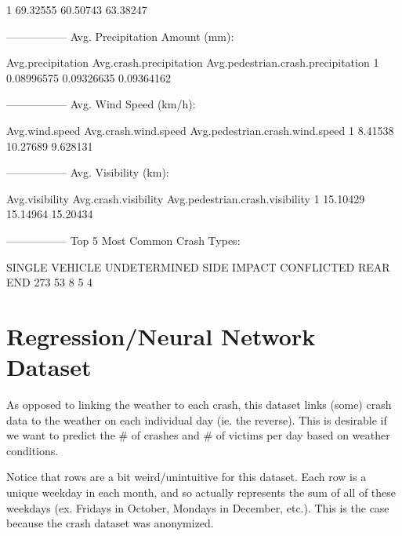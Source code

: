 \documentclass[11pt, a4paper]{article}
\begin{document}
\begin{Schunk}
\begin{Soutput}
1     69.32555           60.50743                      63.38247
\end{Soutput}
\begin{Soutput}
-----------------
Avg. Precipitation Amount (mm):
\end{Soutput}
\begin{Soutput}
  Avg.precipitation Avg.crash.precipitation Avg.pedestrian.crash.precipitation
1        0.08996575              0.09326635                         0.09364162
\end{Soutput}
\begin{Soutput}
-----------------
Avg. Wind Speed (km/h):
\end{Soutput}
\begin{Soutput}
  Avg.wind.speed Avg.crash.wind.speed Avg.pedestrian.crash.wind.speed
1        8.41538             10.27689                        9.628131
\end{Soutput}
\begin{Soutput}
-----------------
Avg. Visibility (km):
\end{Soutput}
\begin{Soutput}
  Avg.visibility Avg.crash.visibility Avg.pedestrian.crash.visibility
1       15.10429             15.14964                        15.20434
\end{Soutput}
\begin{Soutput}
-----------------
Top 5 Most Common Crash Types:
\end{Soutput}
\begin{Soutput}
SINGLE VEHICLE   UNDETERMINED    SIDE IMPACT     CONFLICTED       REAR END 
           273             53              8              5              4 
\end{Soutput}
\end{Schunk}









\pagebreak
\section{Regression/Neural Network Dataset}

As opposed to linking the weather to each crash, this dataset links (some) crash data to the weather on each individual day (ie. the reverse). This is desirable if we want to predict the \# of crashes and \# of victims per day based on weather conditions. 


Notice that rows are a bit weird/unintuitive for this dataset. Each row is a unique weekday in each month, and so actually represents the sum of all of these weekdays (ex. Fridays in October, Mondays in December, etc.). This is the case because the crash dataset was anonymized. 
\end{document}
